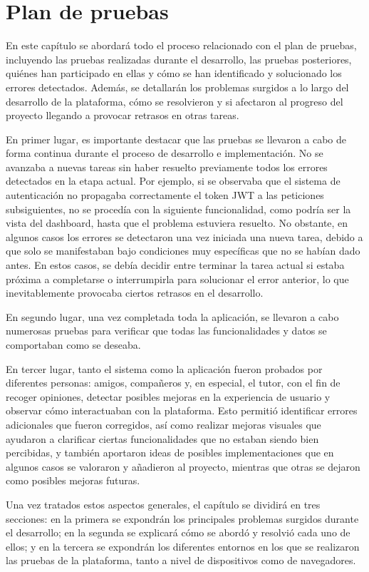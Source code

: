 \chapter{Plan de pruebas}
\label{chap:plan_pruebas}

En este capítulo se abordará todo el proceso relacionado con el plan de pruebas, incluyendo las pruebas realizadas durante el desarrollo, las pruebas posteriores, quiénes han participado en ellas y cómo se han identificado y solucionado los errores detectados. Además, se detallarán los problemas surgidos a lo largo del desarrollo de la plataforma, cómo se resolvieron y si afectaron al progreso del proyecto llegando a provocar retrasos en otras tareas.

En primer lugar, es importante destacar que las pruebas se llevaron a cabo de forma continua durante el proceso de desarrollo e implementación. No se avanzaba a nuevas tareas sin haber resuelto previamente todos los errores detectados en la etapa actual. Por ejemplo, si se observaba que el sistema de autenticación no propagaba correctamente el token JWT a las peticiones subsiguientes, no se procedía con la siguiente funcionalidad, como podría ser la vista del dashboard, hasta que el problema estuviera resuelto. No obstante, en algunos casos los errores se detectaron una vez iniciada una nueva tarea, debido a que solo se manifestaban bajo condiciones muy específicas que no se habían dado antes. En estos casos, se debía decidir entre terminar la tarea actual si estaba próxima a completarse o interrumpirla para solucionar el error anterior, lo que inevitablemente provocaba ciertos retrasos en el desarrollo.

En segundo lugar, una vez completada toda la aplicación, se llevaron a cabo numerosas pruebas para verificar que todas las funcionalidades y datos se comportaban como se deseaba.

En tercer lugar, tanto el sistema como la aplicación fueron probados por diferentes personas: amigos, compañeros y, en especial, el tutor, con el fin de recoger opiniones, detectar posibles mejoras en la experiencia de usuario y observar cómo interactuaban con la plataforma. Esto permitió identificar errores adicionales que fueron corregidos, así como realizar mejoras visuales que ayudaron a clarificar ciertas funcionalidades que no estaban siendo bien percibidas, y también aportaron ideas de posibles implementaciones que en algunos casos se valoraron y añadieron al proyecto, mientras que otras se dejaron como posibles mejoras futuras.

Una vez tratados estos aspectos generales, el capítulo se dividirá en tres secciones: en la primera se expondrán los principales problemas surgidos durante el desarrollo; en la segunda se explicará cómo se abordó y resolvió cada uno de ellos; y en la tercera se expondrán los diferentes entornos en los que se realizaron las pruebas de la plataforma, tanto a nivel de dispositivos como de navegadores.






